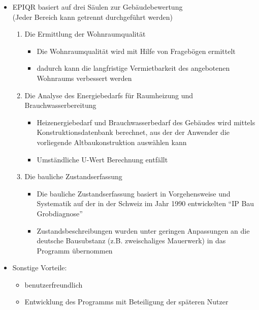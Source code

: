 \documentclass[fleqn,twoside,dvipsnames]{article}
\begin{document}
        \begin{itemize}
            \item EPIQR basiert auf drei Säulen zur Gebäudebewertung \\(Jeder Bereich kann getrennt durchgeführt werden)
                \begin{enumerate}
                    \item Die Ermittlung der Wohnraumqualität
                        \begin{itemize}
                            \item Die Wohnraumqualität wird mit Hilfe von Fragebögen ermittelt
                            \item dadurch kann die langfristige Vermietbarkeit des angebotenen Wohnraums verbessert werden
                        \end{itemize}
                    \item Die Analyse des Energiebedarfs für Raumheizung und Brauchwasserbereitung
                        \begin{itemize}
                            \item Heizenergiebedarf und Brauchwasserbedarf des Gebäudes wird mittels Konstruktionsdatenbank berechnet, aus der der Anwender die vorliegende Altbaukonstruktion auswählen kann
                            \item Umständliche U-Wert Berechnung entfällt
                        \end{itemize}
                    \item Die bauliche Zustandserfassung
                        \begin{itemize}
                            \item Die bauliche Zustandserfassung basiert in Vorgehensweise und Systematik auf der in der Schweiz im Jahr 1990 entwickelten \enquote{IP Bau Grobdiagnose}
                            \item Zustandsbeschreibungen wurden unter geringen Anpassungen an die deutsche Bausubstanz (z.B. zweischaliges Mauerwerk) in das Programm übernommen
                        \end{itemize}
                \end{enumerate}
            \item Sonstige Vorteile:
                \begin{itemize}
                    \item benutzerfreundlich
                    \item Entwicklung des Programms mit Beteiligung der späteren Nutzer

\end{itemize}
\end{itemize}
\end{document}
